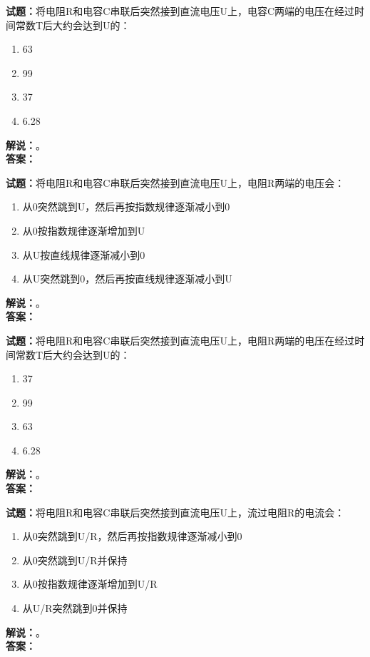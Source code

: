 \documentclass{ctexbook}
\begin{document}
\vspace{\baselineskip}

\noindent\textbf{试题：}将电阻R和电容C串联后突然接到直流电压U上，电容C两端的电压在经过时间常数T后大约会达到U的：
\begin{enumerate}[leftmargin=3em]
  \item 63%
  \item 99%
  \item 37%
  \item 6.28%
\end{enumerate}
\noindent\textbf{解说：}\textbf{}。\\\noindent\textbf{答案：}

\vspace{\baselineskip}

\noindent\textbf{试题：}将电阻R和电容C串联后突然接到直流电压U上，电阻R两端的电压会：
\begin{enumerate}[leftmargin=3em]
  \item 从0突然跳到U，然后再按指数规律逐渐减小到0
  \item 从0按指数规律逐渐增加到U
  \item 从U按直线规律逐渐减小到0
  \item 从U突然跳到0，然后再按直线规律逐渐减小到U
\end{enumerate}
\noindent\textbf{解说：}\textbf{}。\\\noindent\textbf{答案：}

\vspace{\baselineskip}

\noindent\textbf{试题：}将电阻R和电容C串联后突然接到直流电压U上，电阻R两端的电压在经过时间常数T后大约会达到U的：
\begin{enumerate}[leftmargin=3em]
  \item 37%
  \item 99%
  \item 63%
  \item 6.28%
\end{enumerate}
\noindent\textbf{解说：}\textbf{}。\\\noindent\textbf{答案：}

\vspace{\baselineskip}

\noindent\textbf{试题：}将电阻R和电容C串联后突然接到直流电压U上，流过电阻R的电流会：
\begin{enumerate}[leftmargin=3em]
  \item 从0突然跳到U/R，然后再按指数规律逐渐减小到0
  \item 从0突然跳到U/R并保持
  \item 从0按指数规律逐渐增加到U/R
  \item 从U/R突然跳到0并保持
\end{enumerate}
\noindent\textbf{解说：}\textbf{}。\\\noindent\textbf{答案：}
\end{document}
